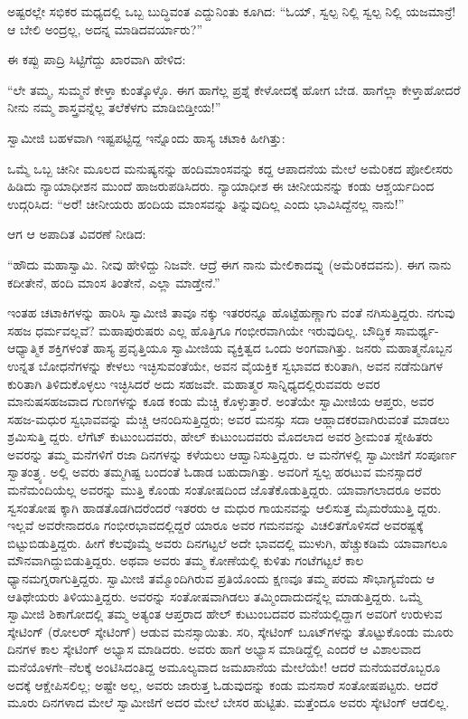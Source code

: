 ಅಷ್ಟರಲ್ಲೇ ಸಭಿಕರ ಮಧ್ಯದಲ್ಲಿ ಒಬ್ಬ ಬುದ್ಧಿವಂತ ಎದ್ದುನಿಂತು ಕೂಗಿದ: “ಓಯ್, ಸ್ವಲ್ಪ ನಿಲ್ಲಿ ಸ್ವಲ್ಪ ನಿಲ್ಲಿ ಯಜಮಾನ್ರೆ! ಆ ಬೇಲಿ ಅಂದ್ರಲ್ಲ, ಅದನ್ನ ಮಾಡಿದವರ್ಯಾರು?”

ಈ ಕಪ್ಪು ಪಾದ್ರಿ ಸಿಟ್ಟಿಗೆದ್ದು ಖಾರವಾಗಿ ಹೇಳಿದ:

“ಲೇ ತಮ್ಮ, ಸುಮ್ಮನೆ ಕೇಳ್ತಾ ಕುಂತ್ಕೊಳ್ಳೊ. ಈಗ ಹಾಗೆಲ್ಲ ಪ್ರಶ್ನೆ ಕೇಳೋದಕ್ಕೆ ಹೋಗ ಬೇಡ. ಹಾಗೆಲ್ಲಾ ಕೇಳ್ತಾಹೋದರೆ ನೀನು ನಮ್ಮ ಶಾಸ್ತ್ರವನ್ನೆಲ್ಲ ತಲೆಕೆಳಗು ಮಾಡಿಬಿಡ್ತೀಯ!”

ಸ್ವಾಮೀಜಿ ಬಹಳವಾಗಿ ಇಷ್ಟಪಟ್ಟಿದ್ದ ಇನ್ನೊಂದು ಹಾಸ್ಯ ಚಟಾಕಿ ಹೀಗಿತ್ತು:

ಒಮ್ಮೆ ಒಬ್ಬ ಚೀನೀ ಮೂಲದ ಮನುಷ್ಯನನ್ನು ಹಂದಿಮಾಂಸವನ್ನು ಕದ್ದ ಆಪಾದನೆಯ ಮೇಲೆ ಅಮೆರಿಕದ ಪೋಲೀಸರು ಹಿಡಿದು ನ್ಯಾಯಾಧೀಶನ ಮುಂದೆ ಹಾಜರುಪಡಿಸಿದರು. ನ್ಯಾಯಾಧೀಶ ಈ ಚೀನೀಯನನ್ನು ಕಂಡು ಆಶ್ಚರ್ಯದಿಂದ ಉದ್ಗರಿಸಿದ: “ಅರೆ! ಚೀನೀಯರು ಹಂದಿಯ ಮಾಂಸವನ್ನು ತಿನ್ನುವುದಿಲ್ಲ ಎಂದು ಭಾವಿಸಿದ್ದೆನಲ್ಲ ನಾನು!”

ಆಗ ಆ ಅಪಾದಿತ ವಿವರಣೆ ನೀಡಿದ:

“ಹೌದು ಮಹಾಸ್ವಾಮಿ. ನೀವು ಹೇಳಿದ್ದು ನಿಜವೇ. ಆದ್ರೆ ಈಗ ನಾನು ಮೇಲಿಕಾದವ್ನು (ಅಮೆರಿಕದವನು). ಈಗ ನಾನು ಕದೀತೇನೆ, ಹಂದಿ ಮಾಂಸ ತಿಂತೇನೆ, ಎಲ್ಲಾ ಮಾಡ್ತೇನೆ.”

ಇಂತಹ ಚಟಾಕಿಗಳನ್ನು ಹಾರಿಸಿ ಸ್ವಾಮೀಜಿ ತಾವೂ ನಕ್ಕು ಇತರರನ್ನೂ ಹೊಟ್ಟೆಹುಣ್ಣಾಗು ವಂತೆ ನಗಿಸುತ್ತಿದ್ದರು. ನಗುವು ಸಹಜ ಧರ್ಮವಲ್ಲವೆ? ಮಹಾಪುರುಷರು ಎಲ್ಲ ಹೊತ್ತಿಗೂ ಗಂಭೀರವಾಗಿಯೇ ಇರುವುದಿಲ್ಲ. ಬೌದ್ಧಿಕ ಸಾಮರ್ಥ್ಯ-ಆಧ್ಯಾತ್ಮಿಕ ಶಕ್ತಿಗಳಂತೆ ಹಾಸ್ಯ ಪ್ರವೃತ್ತಿಯೂ ಸ್ವಾಮೀಜಿಯ ವ್ಯಕ್ತಿತ್ವದ ಒಂದು ಅಂಗವಾಗಿತ್ತು. ಜನರು ಮಹಾತ್ಮನೊಬ್ಬನ ಉನ್ನತ ಬೋಧನೆಗಳನ್ನು ಕೇಳಲು ಇಚ್ಛಿಸುವಂತೆಯೇ, ಅವನ ವೈಯಕ್ತಿಕ ಸ್ವಭಾವದ ಕುರಿತಾಗಿ, ಅವನ ನಡೆನುಡಿಗಳ ಕುರಿತಾಗಿ ತಿಳಿದುಕೊಳ್ಳಲು ಇಚ್ಛಿಸಿದರೆ ಅದು ಸಹಜವೇ. ಮಹಾತ್ಮರ ಸಾನ್ನಿಧ್ಯದಲ್ಲಿರುವವರು ಅವರ ಮಾನುಷಸಹಜವಾದ ಗುಣಗಳನ್ನು ಕೂಡ ಕಂಡು ಮೆಚ್ಚಿ ಕೊಳ್ಳುತ್ತಾರೆ. ಅಂತೆಯೇ ಸ್ವಾಮೀಜಿಯ ಆಪ್ತರು, ಅವರ ಸಹಜ-ಮಧುರ ಸ್ವಭಾವವನ್ನು ಮೆಚ್ಚಿ ಆನಂದಿಸುತ್ತಿದ್ದರು; ಅವರ ಮನಸ್ಸು ಸದಾ ಆಹ್ಲಾದಕರವಾಗಿರುವಂತೆ ಮಾಡಲು ಶ್ರಮಿಸುತ್ತಿ ದ್ದರು. ಲೆಗೆಟ್ ಕುಟುಂಬದವರು, ಹೇಲ್ ಕುಟುಂಬದವರು ಮೊದಲಾದ ಅವರ ಶ್ರೀಮಂತ ಸ್ನೇಹಿತರು ಅವರನ್ನು ತಮ್ಮ ಮನೆಗಳಿಗೆ ರಜಾ ದಿನಗಳನ್ನು ಕಳೆಯಲು ಆಹ್ವಾನಿಸುತ್ತಿದ್ದರು. ಆ ಮನೆಗಳಲ್ಲಿ ಸ್ವಾಮೀಜಿಗೆ ಸಂಪೂರ್ಣ ಸ್ವಾತಂತ್ರ್ಯ. ಅಲ್ಲಿ ಅವರು ತಮ್ಮಗಿಷ್ಟ ಬಂದಂತೆ ಓಡಾಡ ಬಹುದಾಗಿತ್ತು. ಅವರಿಗೆ ಸ್ವಲ್ಪ ಹರಟುವ ಮನಸ್ಸಾದರೆ ಮನೆಮಂದಿಯೆಲ್ಲ ಅವರನ್ನು ಮುತ್ತಿ ಕೊಂಡು ಸಂತೋಷದಿಂದ ಜೊತೆಕೊಡುತ್ತಿದ್ದರು. ಯಾವಾಗಲಾದರೂ ಅವರು ಸ್ವಸಂತೋಷ ಕ್ಕಾಗಿ ಹಾಡತೊಡಗಿದರೆಂದರೆ ಇತರರು ಆ ಮಧುರ ಗಾಯನವನ್ನು ಆಲಿಸುತ್ತ ಮೈಮರೆಯುತ್ತಿ ದ್ದರು. ಇಲ್ಲವೆ ಅವರೇನಾದರೂ ಗಂಭೀರಭಾವದಲ್ಲಿದ್ದರೆ ಯಾರೂ ಅವರ ಗಮನವನ್ನು ವಿಚಲಿತಗೊಳಿಸದೆ ಅವರಷ್ಟಕ್ಕೆ ಬಿಟ್ಟುಬಿಡುತ್ತಿದ್ದರು. ಹೀಗೆ ಕೆಲವೊಮ್ಮೆ ಅವರು ದಿನಗಟ್ಟಲೆ ಅದೇ ಭಾವದಲ್ಲಿ ಮುಳುಗಿ, ಹೆಚ್ಚುಕಡಿಮೆ ಯಾವಾಗಲೂ ಮೌನವಾಗಿದ್ದುಬಿಡುತ್ತಿದ್ದರು. ಅಥವಾ ಅವರು ತಮ್ಮ ಕೋಣೆಯಲ್ಲಿ ಕುಳಿತು ಗಂಟೆಗಟ್ಟಲೆ ಕಾಲ ಧ್ಯಾನಮಗ್ನರಾಗುತ್ತಿದ್ದರು. ಸ್ವಾಮೀಜಿ ತಮ್ಮೊಂದಿಗಿರುವ ಪ್ರತಿಯೊಂದು ಕ್ಷಣವೂ ತಮ್ಮ ಪರಮ ಸೌಭಾಗ್ಯವೆಂದು ಆ ಆತಿಥೇಯರು ತಿಳಿಯುತ್ತಿದ್ದರು. ಅವರನ್ನು ಸಂತೋಷವಾಗಿಡಲು ತಮ್ಮಿಂದಾದುದನ್ನೆಲ್ಲ ಮಾಡುತ್ತಿದ್ದರು. ಒಮ್ಮೆ ಸ್ವಾಮೀಜಿ ಶಿಕಾಗೋದಲ್ಲಿ ತಮ್ಮ ಅತ್ಯಂತ ಆಪ್ತರಾದ ಹೇಲ್ ಕುಟುಂಬದವರ ಮನೆಯಲ್ಲಿದ್ದಾಗ ಅವರಿಗೆ ಉರುಳುವ ಸ್ಕೇಟಿಂಗ್ (ರೋಲರ್ ಸ್ಕೇಟಿಂಗ್​) ಆಡುವ ಮನಸ್ಸಾಯಿತು. ಸರಿ, ಸ್ಕೇಟಿಂಗ್ ಬೂಟ್​ಗಳನ್ನು ತೊಟ್ಟುಕೊಂಡು ಮೂರು ದಿನಗಳ ಕಾಲ ಸ್ಕೇಟಿಂಗ್ ಅಭ್ಯಾಸ ಮಾಡಿದರು. ಅವರು ಹಾಗೆ ಅಭ್ಯಾಸ ಮಾಡಿದ್ದೆಲ್ಲಿ ಎಂದರೆ ಆ ವಿಶಾಲವಾದ ಮನೆಯೊಳಗೇ–ನೆಲಕ್ಕೆ ಅಂಟಿಸಿದಂತಿದ್ದ ಅಮೂಲ್ಯವಾದ ಜಮಖಾನೆಯ ಮೇಲೆಯೇ! ಆದರೆ ಮನೆಯವರೊಬ್ಬರೂ ಅದಕ್ಕೆ ಆಕ್ಷೇಪಿಸಲಿಲ್ಲ; ಅಷ್ಟೇ ಅಲ್ಲ, ಅವರು ಜಾರುತ್ತ ಓಡುವುದನ್ನು ಕಂಡು ಮನಸಾರೆ ಸಂತೋಷಪಟ್ಟರು. ಆದರೆ ಮೂರು ದಿನಗಳಾದ ಮೇಲೆ ಸ್ವಾಮೀಜಿಗೆ ಅದರ ಮೇಲೆ ಬೇಸರ ಹುಟ್ಟಿತು. ಮತ್ತೆಂದೂ ಅವರು ಸ್ಕೇಟಿಂಗ್ ಆಡಲಿಲ್ಲ.

